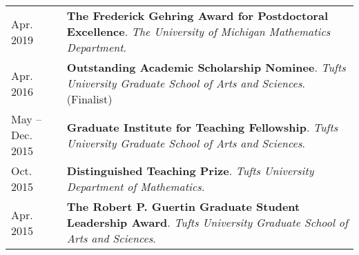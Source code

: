     \vspace{-1em}
    
    \medskip


    \medskip
    
    \begin{center}
    {
    \renewcommand{\arraystretch}{1.5}
    \begin{longtable}{p{}  p{}}
     Apr.  2019 & \textbf{The Frederick Gehring Award for Postdoctoral Excellence}. \textit{The University of Michigan Mathematics Department}.  \\ 
 Apr.  2016 & \textbf{Outstanding Academic Scholarship Nominee}. \textit{Tufts University Graduate School of Arts and Sciences}. (Finalist) \\ 
 May  --  Dec.  2015 & \textbf{Graduate Institute for Teaching Fellowship}. \textit{Tufts University Graduate School of Arts and Sciences}.  \\ 
 Oct.  2015 & \textbf{Distinguished Teaching Prize}. \textit{Tufts University Department of Mathematics}.  \\ 
 Apr.  2015 & \textbf{The Robert P. Guertin Graduate Student Leadership Award}. \textit{Tufts University Graduate School of Arts and Sciences}.  
    \end{longtable}
    } 
    \end{center}

    \vspace{-1em}
    